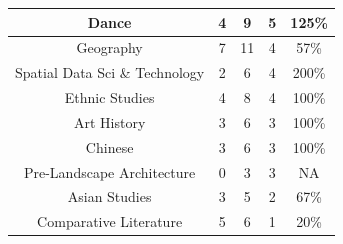 \documentclass[10pt]{article}
\begin{document}
\begin{longtable}[c]{|ccccc|}
	\multicolumn{1}{|c|}{Dance}                                      & \multicolumn{1}{c|}{4}                               & \multicolumn{1}{c|}{9}                                   & \multicolumn{1}{c|}{5}                  & 125\%                 \\ \hline
	\multicolumn{1}{|c|}{Geography}                                  & \multicolumn{1}{c|}{7}                               & \multicolumn{1}{c|}{11}                                  & \multicolumn{1}{c|}{4}                  & 57\%                  \\ \hline
	\multicolumn{1}{|c|}{Spatial Data Sci \& Technology}             & \multicolumn{1}{c|}{2}                               & \multicolumn{1}{c|}{6}                                   & \multicolumn{1}{c|}{4}                  & 200\%                 \\ \hline
	\multicolumn{1}{|c|}{Ethnic Studies}                             & \multicolumn{1}{c|}{4}                               & \multicolumn{1}{c|}{8}                                   & \multicolumn{1}{c|}{4}                  & 100\%                 \\ \hline
	\multicolumn{1}{|c|}{Art History}                                & \multicolumn{1}{c|}{3}                               & \multicolumn{1}{c|}{6}                                   & \multicolumn{1}{c|}{3}                  & 100\%                 \\ \hline
	\multicolumn{1}{|c|}{Chinese}                                    & \multicolumn{1}{c|}{3}                               & \multicolumn{1}{c|}{6}                                   & \multicolumn{1}{c|}{3}                  & 100\%                 \\ \hline
	\multicolumn{1}{|c|}{Pre-Landscape Architecture}                 & \multicolumn{1}{c|}{0}                               & \multicolumn{1}{c|}{3}                                   & \multicolumn{1}{c|}{3}                  & NA                    \\ \hline
	\multicolumn{1}{|c|}{Asian Studies}                              & \multicolumn{1}{c|}{3}                               & \multicolumn{1}{c|}{5}                                   & \multicolumn{1}{c|}{2}                  & 67\%                  \\ \hline
	\multicolumn{1}{|c|}{Comparative Literature}                     & \multicolumn{1}{c|}{5}                               & \multicolumn{1}{c|}{6}                                   & \multicolumn{1}{c|}{1}                  & 20\%                  \\ \hline

\end{longtable}
\end{document}
